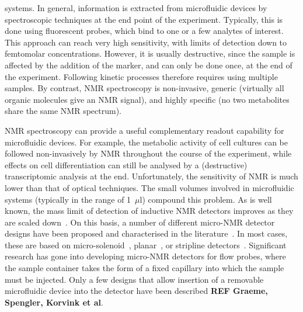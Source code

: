 \documentclass[preprint,12pt]{article}
\newcommand{\todo}[1]{{\color{red}\textbf{#1}}}
\begin{document}
systems. In general, information is extracted from microfluidic devices by spectroscopic 
techniques at the end point of the experiment. Typically, 
this is done using fluorescent probes, which bind to one or a few analytes of interest. 
This approach can reach very high sensitivity, with limits of detection down to 
femtomolar concentrations. However, it is usually destructive, since the sample is 
affected by the addition of the marker, and can only be done once, at the end of the 
experiment. Following kinetic processes therefore requires using multiple samples. By 
contrast, NMR spectroscopy is non-invasive, generic (virtually all organic 
molecules give an NMR signal), and highly specific (no two metabolites share 
the same NMR spectrum). 

NMR spectroscopy can provide a useful complementary readout capability 
for microfluidic devices. For example, the metabolic activity of cell cultures 
can be followed non-invasively by NMR throughout the course of the experiment, 
while effects on cell differentiation can still be analysed by a (destructive) 
transcriptomic analysis at the end. Unfortunately, the sensitivity 
of NMR is much lower than that of optical techniques. 
The small volumes involved in microfluidic systems
 (typically in the range of 1~$\mu$l) 
compound this problem. As is well known, the mass limit of detection of 
inductive NMR detectors improves as they are scaled down~\cite{Olson1995}. 
On this basis, a number of different micro-NMR detector designs have been 
proposed and characterised in the literature~\cite{utz2012review,micronmr2014review}. 
In most cases, these are based on micro-solenoid~\cite{SUBRAMANIAN1998,Pines2007}, 
planar~\cite{Maguire2007,dieter2008,EHRMANN200}, or stripline 
detectors~\cite{stripline_jan}. 
Significant research has gone into developing micro-NMR detectors for flow probes, 
where the sample container takes the form of a fixed capillary into which the sample
must be injected. Only a few designs that allow insertion of a removable microfluidic 
device into the detector have been described \todo{REF Graeme, Spengler, Korvink et al}.
\end{document}
